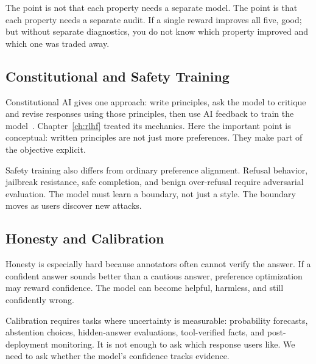 The point is not that each property needs a separate model. The point is that each property needs a separate audit. If a single reward improves all five, good; but without separate diagnostics, you do not know which property improved and which one was traded away.

\noindent{}

\subsection{Constitutional and Safety Training}

Constitutional AI gives one approach: write principles, ask the model to critique and revise responses using those principles, then use AI feedback to train the model~\cite{bai2022constitutional}. Chapter~\ref{ch:rlhf} treated its mechanics. Here the important point is conceptual: written principles are not just more preferences. They make part of the objective explicit.

Safety training also differs from ordinary preference alignment. Refusal behavior, jailbreak resistance, safe completion, and benign over-refusal require adversarial evaluation. The model must learn a boundary, not just a style. The boundary moves as users discover new attacks.

\subsection{Honesty and Calibration}

Honesty is especially hard because annotators often cannot verify the answer. If a confident answer sounds better than a cautious answer, preference optimization may reward confidence. The model can become helpful, harmless, and still confidently wrong.

Calibration requires tasks where uncertainty is measurable: probability forecasts, abstention choices, hidden-answer evaluations, tool-verified facts, and post-deployment monitoring. It is not enough to ask which response users like. We need to ask whether the model's confidence tracks evidence.

